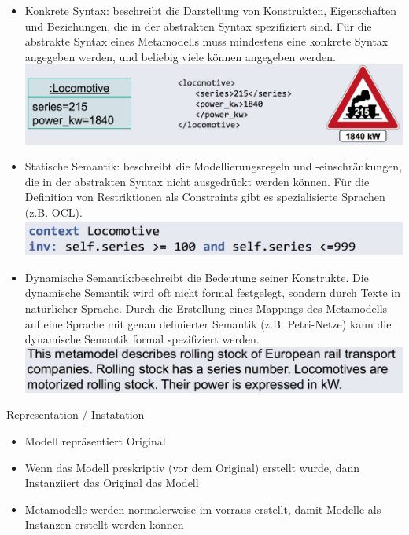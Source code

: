 \documentclass[paper=a4, fontsize=11pt]{scrartcl} %
\numberwithin{equation}{section} %
\numberwithin{figure}{section} %
\numberwithin{table}{section} %
\begin{document}
\begin{itemize}
\begin{itemize}
\begin{itemize}
      \item Konkrete Syntax: beschreibt die Darstellung von Konstrukten, Eigenschaften und Beziehungen, die in der abstrakten Syntax spezifiziert sind. Für die abstrakte Syntax eines Metamodells muss mindestens eine konkrete Syntax angegeben werden, und beliebig viele können angegeben werden.\\
      \includegraphics[width=\textwidth]{imgs/consyntax}
      \item Statische Semantik: beschreibt die Modellierungsregeln und -einschränkungen, die in der abstrakten Syntax nicht ausgedrückt werden können. Für die Definition von Restriktionen als Constraints gibt es spezialisierte Sprachen (z.B. OCL).\\
      \includegraphics[width=\textwidth]{imgs/ocl}
      \item Dynamische Semantik:beschreibt die Bedeutung seiner Konstrukte. Die dynamische Semantik wird oft nicht formal festgelegt, sondern durch Texte in natürlicher Sprache. Durch die Erstellung eines Mappings des Metamodells auf eine Sprache mit genau definierter Semantik (z.B. Petri-Netze) kann die dynamische Semantik formal spezifiziert werden.\\
      \includegraphics[width=\textwidth]{imgs/dynsem}
    \end{itemize}
  \end{itemize}
  \begin{minipage}{.7\textwidth}
    \item Representation / Instatation
    \begin{itemize}
      \item Modell repräsentiert Original
      \item Wenn das Modell preskriptiv (vor dem Original) erstellt wurde, dann Instanziiert das Original das Modell
      \item Metamodelle werden normalerweise im vorraus erstellt, damit Modelle als Instanzen erstellt werden können

\end{itemize}
\end{minipage}
\end{itemize}
\end{document}
